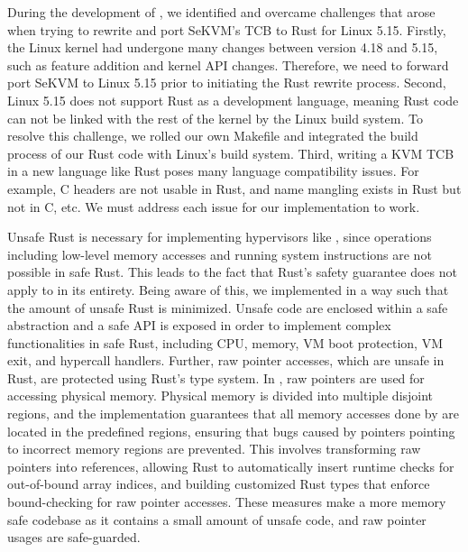 During the development of \rustsec{}, we identified and overcame challenges
that arose when trying to rewrite and port SeKVM's TCB to Rust for Linux 5.15.
Firstly, the Linux kernel had undergone many changes between version 4.18 and
5.15, such as feature addition and kernel API changes. Therefore, we need to
forward port SeKVM to Linux 5.15 prior to initiating the Rust rewrite process.
Second, Linux 5.15 does not support Rust as a development language, meaning
Rust code can not be linked with the rest of the kernel by the Linux build
system. To resolve this challenge, we rolled our own Makefile and integrated
the build process of our Rust code with Linux's build system.
Third, writing a KVM TCB in a new language like Rust poses many language
compatibility issues. For example, C headers are not usable in Rust, and name
mangling exists in Rust but not in C, etc. We must address each issue for our
implementation to work.

Unsafe Rust is necessary for implementing hypervisors like \rustsec{}, since
operations including low-level memory accesses and running system instructions
are not possible in safe Rust.
This leads to the fact that Rust's safety guarantee does not apply to
\rustcore{} in its entirety.
Being aware of this, we implemented \rustcore{} in a way such that the amount
of unsafe Rust is minimized.
Unsafe code are enclosed within a safe abstraction and a safe API is exposed
in order to implement complex functionalities in safe Rust, including CPU,
memory, VM boot protection, VM exit, and hypercall handlers.
Further, raw pointer accesses, which are unsafe in Rust, are protected using
Rust's type system. In \rustcore{}, raw pointers are used for accessing
physical memory. Physical memory is divided into multiple disjoint regions,
and the \rustcore{} implementation guarantees that all memory accesses done by
\rustcore{} are located in the predefined regions, ensuring that bugs caused by
pointers pointing to incorrect memory regions are prevented.
This involves transforming raw pointers into references, allowing Rust to
automatically insert runtime checks for out-of-bound array indices, and
building customized Rust types that enforce bound-checking for raw pointer
accesses.
These measures make \rustcore{} a more memory safe codebase as it contains a
small amount of unsafe code, and raw pointer usages are safe-guarded.

